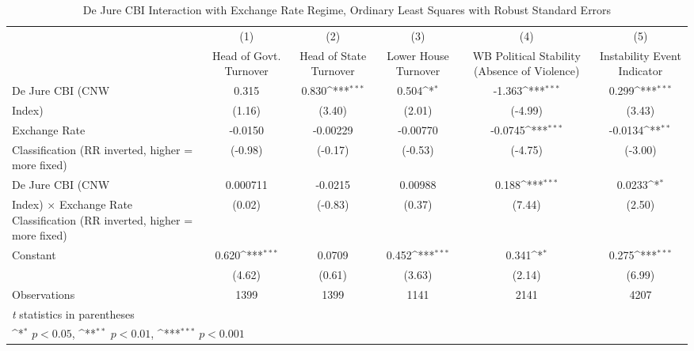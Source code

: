 \begin{table}[htbp]\centering
\def\sym#1{\ifmmode^{#1}\else\(^{#1}\)\fi}
\caption{De Jure CBI Interaction with Exchange Rate Regime, Ordinary Least Squares with Robust Standard Errors \label{imultIndOLSDJ}}
\begin{tabular}{l*{5}{c}}
\hline\hline
                    &\multicolumn{1}{c}{(1)}&\multicolumn{1}{c}{(2)}&\multicolumn{1}{c}{(3)}&\multicolumn{1}{c}{(4)}&\multicolumn{1}{c}{(5)}\\
                    &\multicolumn{1}{c}{Head of Govt. Turnover}&\multicolumn{1}{c}{Head of State Turnover}&\multicolumn{1}{c}{Lower House Turnover}&\multicolumn{1}{c}{WB Political Stability (Absence of Violence)}&\multicolumn{1}{c}{Instability Event Indicator}\\
\hline
De Jure CBI (CNW    &       0.315         &       0.830\sym{***}&       0.504\sym{*}  &      -1.363\sym{***}&       0.299\sym{***}\\
Index)              &      (1.16)         &      (3.40)         &      (2.01)         &     (-4.99)         &      (3.43)         \\
[1em]
Exchange Rate       &     -0.0150         &    -0.00229         &    -0.00770         &     -0.0745\sym{***}&     -0.0134\sym{**} \\
Classification (RR inverted, higher = more fixed)&     (-0.98)         &     (-0.17)         &     (-0.53)         &     (-4.75)         &     (-3.00)         \\
[1em]
De Jure CBI (CNW    &    0.000711         &     -0.0215         &     0.00988         &       0.188\sym{***}&      0.0233\sym{*}  \\
Index) $\times$ Exchange Rate Classification (RR inverted, higher = more fixed)&      (0.02)         &     (-0.83)         &      (0.37)         &      (7.44)         &      (2.50)         \\
[1em]
Constant            &       0.620\sym{***}&      0.0709         &       0.452\sym{***}&       0.341\sym{*}  &       0.275\sym{***}\\
                    &      (4.62)         &      (0.61)         &      (3.63)         &      (2.14)         &      (6.99)         \\
\hline
Observations        &        1399         &        1399         &        1141         &        2141         &        4207         \\
\hline\hline
\multicolumn{6}{l}{\footnotesize \textit{t} statistics in parentheses}\\
\multicolumn{6}{l}{\footnotesize \sym{*} \(p<0.05\), \sym{**} \(p<0.01\), \sym{***} \(p<0.001\)}\\
\end{tabular}
\end{table}
